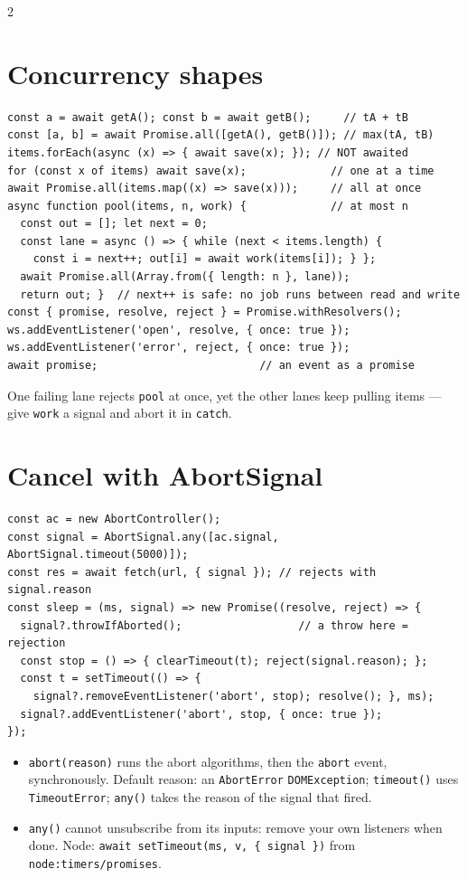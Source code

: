 \documentclass[8pt]{extarticle}
\newcommand\ct[1]{\texttt{#1}}
\begin{document}
\begin{multicols}{2}
\section{Concurrency shapes}
\begin{lstlisting}[style=js]
const a = await getA(); const b = await getB();     // tA + tB
const [a, b] = await Promise.all([getA(), getB()]); // max(tA, tB)
items.forEach(async (x) => { await save(x); }); // NOT awaited
for (const x of items) await save(x);             // one at a time
await Promise.all(items.map((x) => save(x)));     // all at once
async function pool(items, n, work) {             // at most n
  const out = []; let next = 0;
  const lane = async () => { while (next < items.length) {
    const i = next++; out[i] = await work(items[i]); } };
  await Promise.all(Array.from({ length: n }, lane));
  return out; }  // next++ is safe: no job runs between read and write
const { promise, resolve, reject } = Promise.withResolvers();
ws.addEventListener('open', resolve, { once: true });
ws.addEventListener('error', reject, { once: true });
await promise;                         // an event as a promise
\end{lstlisting}
One failing lane rejects \ct{pool} at once, yet the other lanes keep pulling items — give
\ct{work} a signal and abort it in \ct{catch}.

\section{Cancel with AbortSignal}
\begin{lstlisting}[style=js]
const ac = new AbortController();
const signal = AbortSignal.any([ac.signal, AbortSignal.timeout(5000)]);
const res = await fetch(url, { signal }); // rejects with signal.reason
const sleep = (ms, signal) => new Promise((resolve, reject) => {
  signal?.throwIfAborted();                  // a throw here = rejection
  const stop = () => { clearTimeout(t); reject(signal.reason); };
  const t = setTimeout(() => {
    signal?.removeEventListener('abort', stop); resolve(); }, ms);
  signal?.addEventListener('abort', stop, { once: true });
});
\end{lstlisting}
\begin{itemize}
  \item \ct{abort(reason)} runs the abort algorithms, then the \ct{abort} event, synchronously.
        Default reason: an \ct{AbortError} \ct{DOMException}; \ct{timeout()} uses
        \ct{TimeoutError}; \ct{any()} takes the reason of the signal that fired.
  \item \ct{any()} cannot unsubscribe from its inputs: remove your own listeners when done.
        Node: \ct{await setTimeout(ms, v, \{ signal \})} from \ct{node:timers/promises}.
\end{itemize}


\end{multicols}
\end{document}
